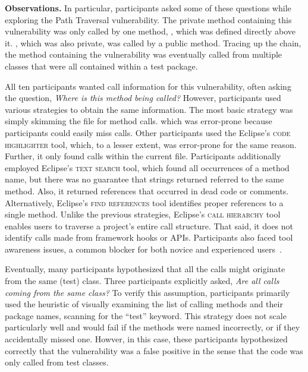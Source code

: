 \documentclass{acm_proc_article-sp}
\begin{document}
\noindent\textbf{Observations.}
In particular, participants asked some of these questions while exploring the Path Traversal vulnerability.
The private method containing this vulnerability was only called by one method, , which was defined directly above it. , which was also private, was called by a public method. Tracing up the chain, the method containing the vulnerability was eventually called from multiple classes that were all contained within a test package.

All ten participants wanted call information for this vulnerability, often asking the question, \textit{Where is this method being called?} 
However, participants used various strategies to obtain the same information.
The most basic strategy was simply skimming the file for method calls. which was error-prone because participants could easily miss calls.
Other participants used the Eclipse's \textsc{code highlighter} tool, which, to a lesser extent, was error-prone for the same reason. Further, it only found calls within the current file.
Participants additionally employed Eclipse's \textsc{text search} tool, which found all occurrences of a method name, but there was no guarantee that strings returned referred to the same method. 
Also, it returned references that occurred in dead code or comments.
Alternatively, Eclipse's \textsc{find references} tool identifies proper references to a single method.
Unlike the previous strategies, Eclipse's \textsc{call hierarchy} tool enables users to traverse a project's entire call structure.
That said, it does not identify calls made from framework hooks or APIs.
Participants also faced tool awareness issues, a common blocker for both novice and experienced users~\cite{murphy-Hill2012fluency}.

Eventually, many participants hypothesized that all the calls might originate from the same (test) class. 
Three participants explicitly asked, \textit{Are all calls coming from the same class?} 
To verify this assumption, participants primarily used the heuristic of visually examining the list of calling methods and their package names, scanning for the ``test'' keyword.
This strategy does not scale particularly well and would fail if the methods were named incorrectly, or if they accidentally missed one.
Howver, in this case, these participants hypothesized correctly that the vulnerability was a false positive in the sense that the code was only called from test classes.


\end{document}
